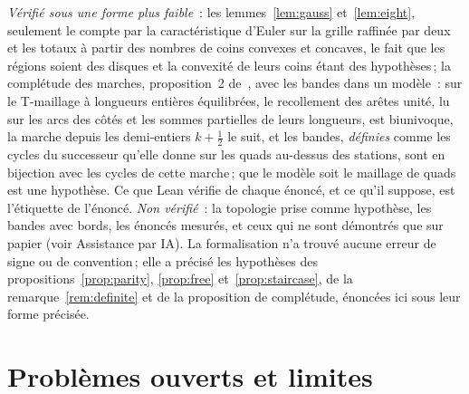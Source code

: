 \documentclass[11pt,a4paper]{article}
\begin{document}
\emph{Vérifié sous une forme plus faible}~: les
lemmes~\ref{lem:gauss} et~\ref{lem:eight}, seulement le compte par la
caractéristique d'Euler sur la grille raffinée par deux et les totaux à partir
des nombres de coins convexes et concaves, le fait que les régions soient des
disques et la convexité de leurs coins étant des hypothèses\,; la complétude
des marches, proposition~2 de~\cite{gardent2026loops}, avec les bandes dans un
modèle~: sur le T-maillage à longueurs entières équilibrées, le recollement des
arêtes unité, lu sur les arcs des côtés et les sommes partielles de leurs
longueurs, est biunivoque, la marche depuis les demi-entiers $k + \frac12$ le
suit, et les bandes, \emph{définies} comme les cycles du successeur qu'elle
donne sur les quads au-dessus des stations, sont en bijection avec les cycles
de cette marche\,; que le modèle soit le maillage de quads est une
hypothèse. 
\else
Ce que Lean vérifie de chaque énoncé, et ce qu'il suppose, est l'étiquette de
l'énoncé.
\fi
\emph{Non vérifié}~: la topologie prise comme hypothèse, les
bandes avec bords, les énoncés mesurés, et ceux qui ne sont démontrés que sur
papier (voir Assistance par IA). La formalisation n'a trouvé aucune erreur de
signe ou de convention\,; elle a précisé les hypothèses des
propositions~\ref{prop:parity}, \ref{prop:free} et~\ref{prop:staircase}, de
la remarque~\ref{rem:definite} et de la proposition de complétude, énoncées
ici sous leur forme précisée.

\section{Problèmes ouverts et limites}\label{sec:open}
\end{document}

